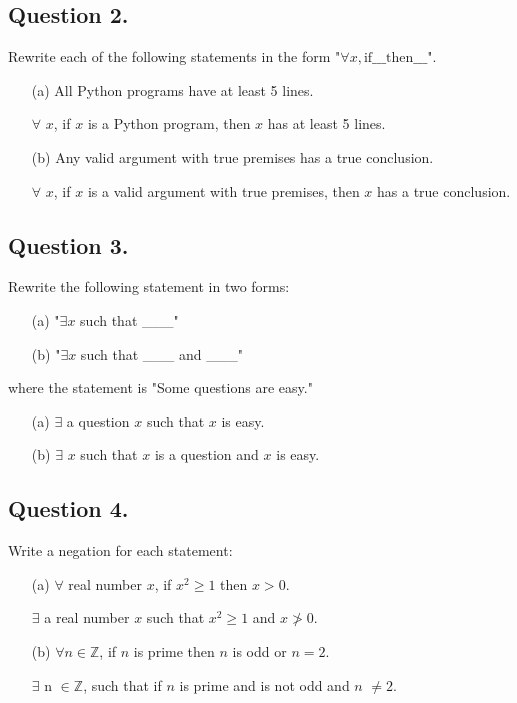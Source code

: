 \documentclass[12pt]{article}
\begin{document}
\subsection*{Question 2.}
Rewrite each of the following statements in the form "$\forall x, \text{if} \_\_\_ \text{then} \_\_\_$".
\begin{enumerate}
	\item[(a)] All Python programs have at least 5 lines.

	      \(\forall\) \(x\), if \(x\) is a Python program, then \(x\) has at least 5 lines.
	\item[(b)] Any valid argument with true premises has a true conclusion.

	      \(\forall\) \(x\), if \(x\) is a valid argument with true premises, then \(x\) has a true conclusion.
\end{enumerate}

\subsection*{Question 3.}
Rewrite the following statement in two forms:
\begin{enumerate}
	\item[(a)] "$\exists x$ such that \_\_\_"
	\item[(b)] "$\exists x$ such that \_\_\_ and \_\_\_"
\end{enumerate}
where the statement is "Some questions are easy."

\begin{enumerate}
	\item[(a)]
	      \(\exists\) a question \(x\) such that \(x\) is easy.
	\item[(b)]
	      \(\exists\) \(x\) such that \(x\) is a question and \(x\) is easy.
\end{enumerate}

\subsection*{Question 4.}
Write a negation for each statement:
\begin{enumerate}
	\item[(a)] $\forall$ real number $x$, if $x^2 \geq 1$ then $x > 0$.

	      \(\exists\) a real number \(x\) such that \(x^2 \geq 1\) and \(x \ngtr 0\).
	\item[(b)] $\forall n \in \mathbb{Z}$, if $n$ is prime then $n$ is odd or $n = 2$.

	      \(\exists\) n \(\in  \mathbb{Z}\), such that if \(n\) is prime and is not odd and \(n\) \(\ne 2\).
\end{enumerate}
\end{document}
